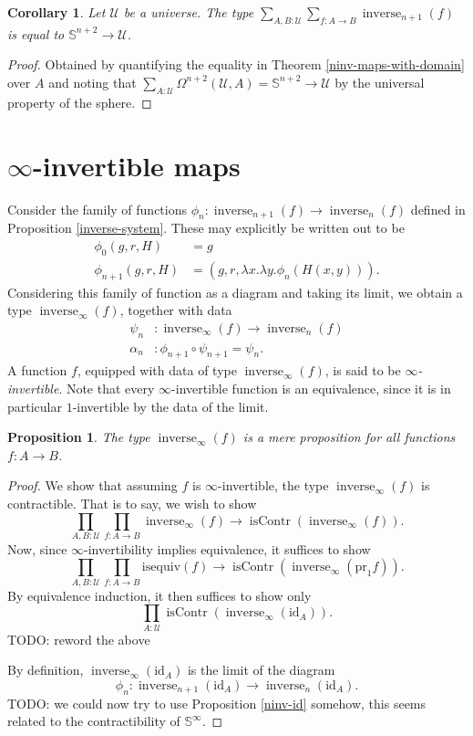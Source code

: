 \documentclass{article}
\theoremstyle{plain}
\newtheorem{proposition}[theorem]{Proposition}
\newtheorem{corollary}[theorem]{Corollary}
\theoremstyle{definition}
\theoremstyle{remark}
\newcommand{\id}{\mathrm{id}}
\newcommand{\isequiv}{\mathrm{isequiv}}
\newcommand{\pr}{\mathrm{pr}}
\newcommand{\nsphere}[1]{\mathbb{S}^{#1}}
\newcommand{\U}{\mathcal{U}}
\newcommand{\lspace}[1]{\Omega^{#1}}
\DeclareMathOperator{\inverse}{inverse}
\DeclareMathOperator{\contr}{isContr}
\newcommand{\ninverse}[1]{\inverse_{#1}}
\begin{document}
\begin{corollary}
  Let \(\U\) be a universe. The type
  \(\sum_{A, B : \U}\sum_{f : A \to B}\ninverse{n + 1}(f)\) is equal to
  \(\nsphere{n + 2} \to \U\).
\end{corollary}

\begin{proof}
  Obtained by quantifying the equality in Theorem \ref{ninv-maps-with-domain} over \(A\)
  and noting
  that \(\sum_{A : \U}\lspace{n + 2}(\U, A) = \nsphere{n + 2} \to \U\) by the universal
  property of the sphere.
\end{proof}

\section{\(\infty\)-invertible maps}

Consider the family of functions \(\phi_{n} : \ninverse{n + 1}(f) \to \ninverse{n}(f)\)
defined in Proposition \ref{inverse-system}. These may explicitly be written out to be
\begin{align*}
  \phi_{0}(g, r, H)     &= g \\
  \phi_{n + 1}(g, r, H) &= (g, r, \lambda x.\lambda y.\phi_{n}(H(x, y))).
\end{align*}
Considering this family of function as a diagram and taking its limit, we obtain a type
\(\ninverse{\infty}(f)\), together with data
\begin{align*}
  \psi_{n}   &: \ninverse{\infty}(f) \to \ninverse{n}(f) \\
  \alpha_{n} &: \phi_{n + 1} \circ \psi_{n + 1} = \psi_{n}.
\end{align*}
A function \(f\), equipped with data of type \(\ninverse{\infty}(f)\), is said to be
\emph{\(\infty\)-invertible}.
Note that every \(\infty\)-invertible function is an equivalence, since it is in particular
\(1\)-invertible by the data of the limit.

\begin{proposition}
  The type \(\ninverse{\infty}(f)\) is a mere proposition for all functions \(f : A \to B\).
\end{proposition}

\begin{proof}
  We show that assuming \(f\) is \(\infty\)-invertible, the type \(\ninverse{\infty}(f)\) is
  contractible. That is to say, we wish to show
  \[\prod_{A, B : \U}\prod_{f : A \to B}\ninverse{\infty}(f) \to
    \contr(\ninverse{\infty}(f)).\]
  Now, since \(\infty\)-invertibility implies equivalence, it suffices to show
  \[\prod_{A, B : \U}\prod_{f : A \to B}\isequiv(f)
    \to \contr(\ninverse{\infty}(\pr_{1}f)).\]
  By equivalence induction, it then suffices to show only
  \[\prod_{A : \U}\contr(\ninverse{\infty}(\id_{A})).\]
  TODO: reword the above
  
  By definition, \(\ninverse{\infty}(\id_{A})\) is the limit of the diagram
  \[\phi_{n} : \ninverse{n + 1}(\id_{A}) \to \ninverse{n}(\id_{A}).\]
  TODO: we could now try to use Proposition \ref{ninv-id} somehow, this seems related to
  the contractibility of \(\nsphere{\infty}\).
\end{proof}
\end{document}
